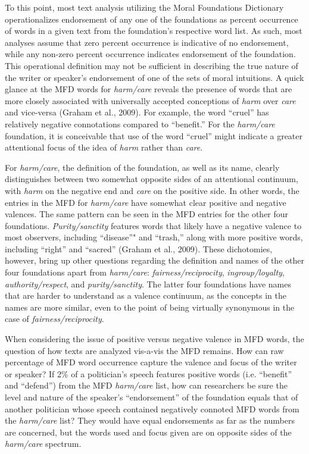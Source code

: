 \documentclass[,man]{apa6}
\begin{document}
To this point, most text analysis utilizing the Moral Foundations Dictionary operationalizes endorsement of any one of the foundations as percent occurrence of words in a given text from the foundation's respective word list. As such, most analyses assume that zero percent occurrence is indicative of no endorsement, while any non-zero percent occurrence indicates endorsement of the foundation. This operational definition may not be sufficient in describing the true nature of the writer or speaker's endorsement of one of the sets of moral intuitions. A quick glance at the MFD words for \emph{harm/care} reveals the presence of words that are more closely associated with universally accepted conceptions of \emph{harm} over \emph{care} and vice-versa (Graham et al., 2009). For example, the word \enquote{cruel} has relatively negative connotations compared to \enquote{benefit.} For the \emph{harm/care} foundation, it is conceivable that use of the word \enquote{cruel} might indicate a greater attentional focus of the idea of \emph{harm} rather than \emph{care}.

For \emph{harm/care}, the definition of the foundation, as well as its name, clearly distinguishes between two somewhat opposite sides of an attentional continuum, with \emph{harm} on the negative end and \emph{care} on the positive side. In other words, the entries in the MFD for \emph{harm/care} have somewhat clear positive and negative valences. The same pattern can be seen in the MFD entries for the other four foundations. \emph{Purity/sanctity} features words that likely have a negative valence to most observers, including \enquote{disease}" and \enquote{trash,} along with more positive words, including \enquote{right} and \enquote{sacred} (Graham et al., 2009). These dichotomies, however, bring up other questions regarding the definition and names of the other four foundations apart from \emph{harm/care}: \emph{fairness/reciprocity}, \emph{ingroup/loyalty}, \emph{authority/respect}, and \emph{purity/sanctity}. The latter four foundations have names that are harder to understand as a valence continuum, as the concepts in the names are more similar, even to the point of being virtually synonymous in the case of \emph{fairness/reciprocity}.

When considering the issue of positive versus negative valence in MFD words, the question of how texts are analyzed vis-a-vis the MFD remains. How can raw percentage of MFD word occurrence capture the valence and focus of the writer or speaker? If 2\% of a politician's speech features positive words (i.e. \enquote{benefit} and \enquote{defend}) from the MFD \emph{harm/care} list, how can researchers be sure the level and nature of the speaker's \enquote{endorsement} of the foundation equals that of another politician whose speech contained negatively connoted MFD words from the \emph{harm/care} list? They would have equal endorsements as far as the numbers are concerned, but the words used and focus given are on opposite sides of the \emph{harm/care} spectrum.
\end{document}
